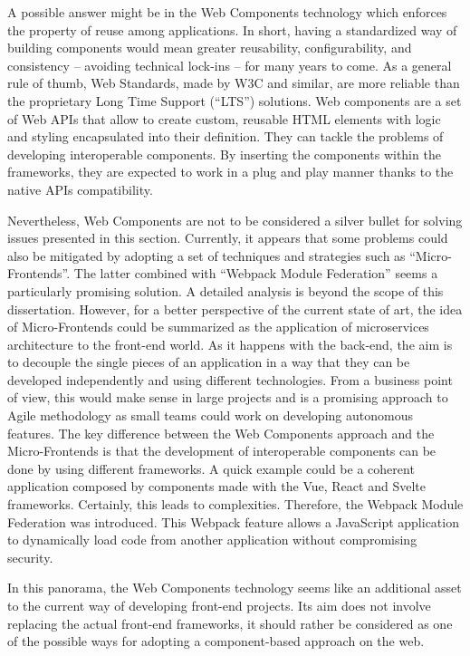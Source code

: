 A possible answer might be in the Web Components technology which enforces the property of reuse among applications. In short, having a standardized way of building components would mean greater reusability, configurability, and consistency – avoiding technical lock-ins – for many years to come. As a general rule of thumb, Web Standards, made by W3C and similar, are more reliable than the proprietary Long Time Support (“LTS”) solutions. Web components are a set of Web APIs that allow to create custom, reusable HTML elements with logic and styling encapsulated into their definition. They can tackle the problems of developing interoperable components. By inserting the components within the frameworks, they are expected to work in a plug and play manner thanks to the native APIs compatibility.

Nevertheless, Web Components are not to be considered a silver bullet for solving issues presented in this section. Currently, it appears that some problems could also be mitigated by adopting a set of techniques and strategies such as “Micro-Frontends”. The latter combined with “Webpack Module Federation” seems a particularly promising solution. A detailed analysis is beyond the scope of this dissertation. However, for a better perspective of the current state of art, the idea of Micro-Frontends could be summarized as the application of microservices architecture to the front-end world. As it happens with the back-end, the aim is to decouple the single pieces of an application in a way that they can be developed independently and using different technologies. From a business point of view, this would make sense in large projects and is a promising approach to Agile methodology as small teams could work on developing autonomous features. The key difference between the Web Components approach and the Micro-Frontends is that the development of interoperable components can be done by using different frameworks. A quick example could be a coherent application composed by components made with the Vue, React and Svelte frameworks. Certainly, this leads to complexities. Therefore, the Webpack Module Federation was introduced. This Webpack feature allows a JavaScript application to dynamically load code from another application without compromising security.

In this panorama, the Web Components technology seems like an additional asset to the current way of developing front-end projects. Its aim does not involve replacing the actual front-end frameworks, it should rather be considered as one of the possible ways for adopting a component-based approach on the web. 


